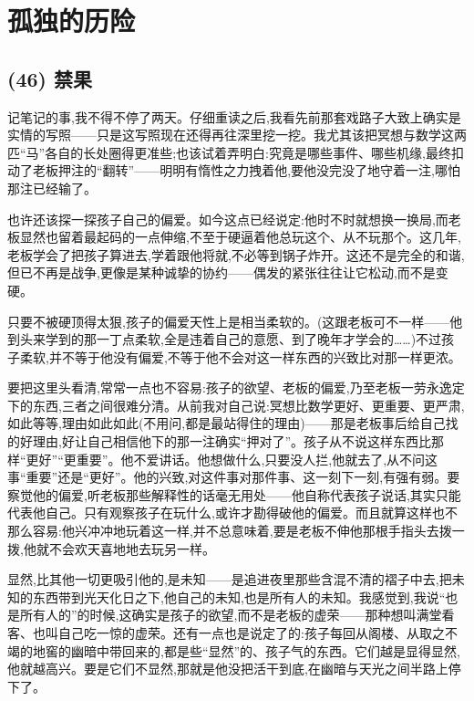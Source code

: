 \chapter{孤独的历险}

\section{(46) 禁果}

 记笔记的事,我不得不停了两天。仔细重读之后,我看先前那套戏路子大致上确实是实情的写照——只是这写照现在还得再往深里挖一挖。我尤其该把冥想与数学这两匹“马”各自的长处圈得更准些;也该试着弄明白:究竟是哪些事件、哪些机缘,最终扣动了老板押注的“翻转”——明明有惰性之力拽着他,要他没完没了地守着一注,哪怕那注已经输了。

也许还该探一探孩子自己的偏爱。如今这点已经说定:他时不时就想换一换局,而老板显然也留着最起码的一点伸缩,不至于硬逼着他总玩这个、从不玩那个。这几年,老板学会了把孩子算进去,学着跟他将就,不必等到锅子炸开。这还不是完全的和谐,但已不再是战争,更像是某种诚挚的协约——偶发的紧张往往让它松动,而不是变硬。

只要不被硬顶得太狠,孩子的偏爱天性上是相当柔软的。(这跟老板可不一样——他到头来学到的那一丁点柔软,全是违着自己的意愿、到了晚年才学会的……)不过孩子柔软,并不等于他没有偏爱,不等于他不会对这一样东西的兴致比对那一样更浓。

要把这里头看清,常常一点也不容易:孩子的欲望、老板的偏爱,乃至老板一劳永逸定下的东西,三者之间很难分清。从前我对自己说:冥想比数学更好、更重要、更严肃,如此等等,理由如此如此(不用问,都是最站得住的理由)——那是老板事后给自己找的好理由,好让自己相信他下的那一注确实“押对了”。孩子从不说这样东西比那样“更好”“更重要”。他不爱讲话。他想做什么,只要没人拦,他就去了,从不问这事“重要”还是“更好”。他的兴致,对这件事对那件事、这一刻下一刻,有强有弱。要察觉他的偏爱,听老板那些解释性的话毫无用处——他自称代表孩子说话,其实只能代表他自己。只有观察孩子在玩什么,或许才勘得破他的偏爱。而且就算这样也不那么容易:他兴冲冲地玩着这一样,并不总意味着,要是老板不伸他那根手指头去拨一拨,他就不会欢天喜地地去玩另一样。

 显然,比其他一切更吸引他的,是未知——是追进夜里那些含混不清的褶子中去,把未知的东西带到光天化日之下,他自己的未知,也是所有人的未知。我感觉到,我说“也是所有人的”的时候,这确实是孩子的欲望,而不是老板的虚荣——那种想叫满堂看客、也叫自己吃一惊的虚荣。还有一点也是说定了的:孩子每回从阁楼、从取之不竭的地窖的幽暗中带回来的,都是些“显然”的、孩子气的东西。它们越是显得显然,他就越高兴。要是它们不显然,那就是他没把活干到底,在幽暗与天光之间半路上停下了。


